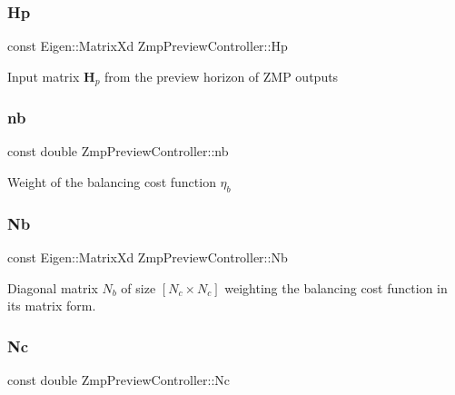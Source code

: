 \subsubsection{\texorpdfstring{Hp}{Hp}}
{\footnotesize\ttfamily const Eigen\+::\+Matrix\+Xd Zmp\+Preview\+Controller\+::\+Hp\hspace{0.3cm}{\ttfamily [private]}}

Input matrix $\mathbf{H}_p$ from the preview horizon of Z\+MP outputs \hypertarget{classZmpPreviewController_a6716ee4c94e6f91e608ee1e29fbc7051}{}\label{classZmpPreviewController_a6716ee4c94e6f91e608ee1e29fbc7051} 
\subsubsection{\texorpdfstring{nb}{nb}}
{\footnotesize\ttfamily const double Zmp\+Preview\+Controller\+::nb\hspace{0.3cm}{\ttfamily [private]}}

Weight of the balancing cost function $ \eta_b $ \hypertarget{classZmpPreviewController_abd345d397e99ae01ad4ea80cd9894802}{}\label{classZmpPreviewController_abd345d397e99ae01ad4ea80cd9894802} 
\subsubsection{\texorpdfstring{Nb}{Nb}}
{\footnotesize\ttfamily const Eigen\+::\+Matrix\+Xd Zmp\+Preview\+Controller\+::\+Nb\hspace{0.3cm}{\ttfamily [private]}}

Diagonal matrix $N_b$ of size $[N_c \times N_c]$ weighting the balancing cost function in its matrix form. \hypertarget{classZmpPreviewController_a43e471820b285c89e9d1878448a6f364}{}\label{classZmpPreviewController_a43e471820b285c89e9d1878448a6f364} 
\subsubsection{\texorpdfstring{Nc}{Nc}}
{\footnotesize\ttfamily const double Zmp\+Preview\+Controller\+::\+Nc\hspace{0.3cm}{\ttfamily [private]}}


